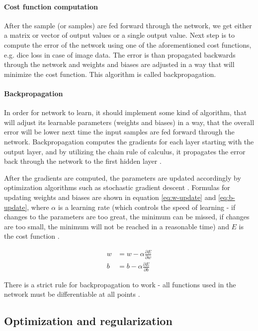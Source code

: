 \paragraph{Cost function computation}
After the sample (or samples) are fed forward through the network, we get either a matrix or vector of output values or a single output value. Next step is to compute the error of the network using one of the aforementioned cost functions, e.g. dice loss in case of image data. The error is than propagated backwards through the network and weights and biases are adjusted in a way that will minimize the cost function. This algorithm is called backpropagation.

\paragraph{Backpropagation}
In order for network to learn, it should implement some kind of algorithm, that will adjust its learnable parameters (weights and biases) in a way, that the overall error will be lower next time the input samples are fed forward through the network. Backpropagation computes the gradients for each layer starting with the output layer, and by utilizing the chain rule of calculus, it propagates the error back through the network to the first hidden layer \cite{LeCun2015}.

After the gradients are computed, the parameters are updated accordingly by optimization algorithms such as stochastic gradient descent \cite{Santosh2022-2}. Formulas for updating weights and biases are shown in equation \ref{eq:w-update} and \ref{eq:b-update}, where $\alpha$ is a learning rate (which controls the speed of learning - if changes to the parameters are too great, the minimum can be missed, if changes are too small, the minimum will not be reached in a reasonable time) and $E$ is the cost function \cite{Goodfellow2016, LeCun2015}.

\begin{align}
\label{eq:w-update}
w &= w - \alpha \frac{\partial E}{\partial w} \\
\label{eq:b-update}
b &=  b - \alpha \frac{\partial E}{\partial b}
\end{align}

There is a strict rule for backpropagation to work - all functions used in the network must be differentiable at all points \cite{Rumelhart1986, Santosh2022-2}.

\subsection{Optimization and regularization}

